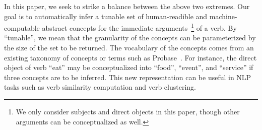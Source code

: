 In this paper, we seek to strike a balance between the above two
extremes. Our goal is to automatically infer a tunable set of
human-readible and machine-computable abstract concepts for
the immediate arguments~\footnote{We only consider subjects and
direct objects in this paper, though other arguments can be conceptualized
as well.} of a verb. By ``tunable'', we mean that the granularity of
the concepts can be parameterized by the size of the set to be returned.
The vocabulary of the concepts
comes from an existing taxonomy of concepts or terms such as
Probase~\cite{WuLWZ12}.%
For instance, the direct object of verb ``eat'' may be conceptualized
into ``food'', ``event'', and ``service'' if three concepts are
to be inferred. This new representation can be useful in NLP tasks such as
verb similarity computation and verb clustering.



